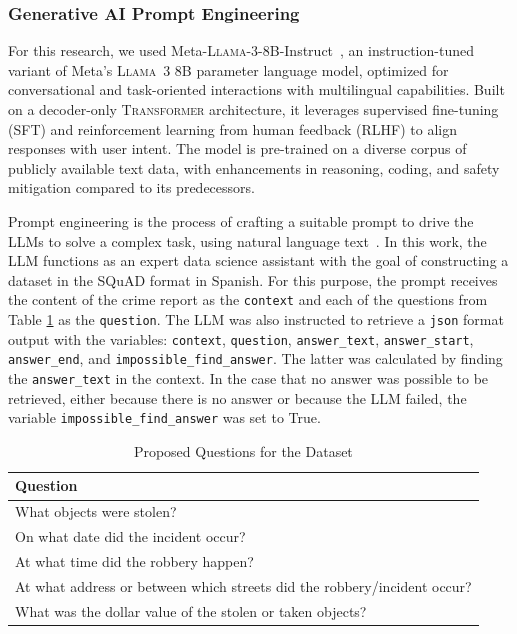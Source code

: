 \documentclass[runningheads]{llncs}
\begin{document}
\subsubsection{Generative AI Prompt Engineering}
\label{sec:prompt-engin-gai}


For this research, we used
Meta-\textsc{Llama}-3-8B-Instruct~\cite{llama3modelcard}, an
instruction-tuned variant of Meta’s \textsc{Llama}~3 8B parameter
language model, optimized for conversational and task-oriented
interactions with multilingual capabilities. Built on a decoder-only
\textsc{Transformer} architecture, it leverages supervised fine-tuning
(\textsc{SFT}) and reinforcement learning from human feedback
(\textsc{RLHF}) to align responses with user intent. The model is
pre-trained on a diverse corpus of publicly available text data, with
enhancements in reasoning, coding, and safety mitigation compared to
its predecessors.

Prompt engineering is the process of crafting a suitable prompt to
drive the \ac{LLMs} to solve a complex task, using natural language
text~\cite{Zhao2023}. In this work, the LLM functions as an expert
data science assistant with the goal of constructing a dataset in the
\ac{SQuAD} format in Spanish. For this purpose, the prompt receives
the content of the crime report as the \texttt{context} and each of
the questions from Table \ref{tab:commonquestions} as the
\texttt{question}. The LLM was also instructed to retrieve a
\texttt{json} format output with the variables: \texttt{context},
\texttt{question}, \texttt{answer\_text}, \texttt{answer\_start},
\texttt{answer\_end}, and \texttt{impossible\_find\_answer}. The
latter was calculated by finding the \texttt{answer\_text} in the
context. In the case that no answer was possible to be retrieved,
either because there is no answer or because the LLM failed, the
variable \texttt{impossible\_find\_answer} was set to True.

\begin{table}[h]
  \centering
  \small
\caption{Proposed Questions for the Dataset}
\label{tab:commonquestions}
\begin{tabular}{|p{}|}
\hline
\textbf{Question} \\
\hline
What objects were stolen? \\
On what date did the incident occur? \\
At what time did the robbery happen? \\
At what address or between which streets did the robbery/incident occur? \\
What was the dollar value of the stolen or taken objects? \\
\hline
\end{tabular}
\end{table}
\end{document}
